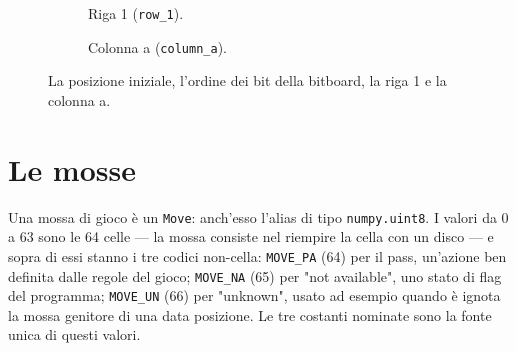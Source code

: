 \begin{figure}[htbp]
  \begin{subfigure}[b]{0.45\textwidth}
    \centering
    \caption{Riga 1 (\texttt{row\_1}).}
  \end{subfigure}
  \hfill
  \begin{subfigure}[b]{0.45\textwidth}
    \centering
    \caption{Colonna a (\texttt{column\_a}).}
  \end{subfigure}

  \caption{La posizione iniziale, l'ordine dei bit della bitboard, la riga 1 e la colonna a.}
  \label{fig:bitboard-bit-ordine}
\end{figure}

\section{Le mosse}

Una mossa di gioco è un \texttt{Move}: anch'esso l'alias di tipo \texttt{numpy.uint8}. I valori da 0 a 63 sono le 64
celle — la mossa consiste nel riempire la cella con un disco — e sopra di essi stanno i tre codici non-cella:
\texttt{MOVE\_PA} (64) per il pass, un'azione ben definita dalle regole del gioco; \texttt{MOVE\_NA} (65) per
"not available", uno stato di flag del programma; \texttt{MOVE\_UN} (66) per "unknown", usato ad esempio quando è
ignota la mossa genitore di una data posizione. Le tre costanti nominate sono la fonte unica di questi valori.
